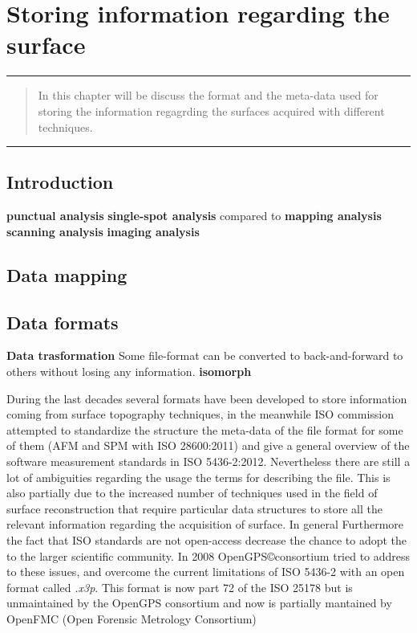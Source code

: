 \chapter{Storing information regarding the surface}

\hrule
\vspace{10pt}
\begin{quote}
{ \small In this chapter will be discuss the format and the meta-data used for storing the information regagrding the surfaces acquired with different techniques.}
\end{quote}
\hrule



\section*{Introduction}

\textbf{punctual analysis} \textbf{single-spot analysis} compared to \textbf{mapping analysis} \textbf{scanning analysis} \textbf{imaging analysis}

\section{Data mapping}
\section{Data formats}

\textbf{Data trasformation}
Some file-format can be converted to back-and-forward to others without losing any information. \textbf{isomorph}

During the last decades several formats have been developed to store information coming from surface topography techniques, in the meanwhile ISO commission attempted to standardize the structure the meta-data of the file format for some of them (AFM and SPM with ISO 28600:2011) and give a general overview of the software measurement standards in ISO 5436-2:2012. Nevertheless there are still a lot of ambiguities regarding the usage the terms for describing the file. 
This is also partially due to the increased number of techniques used in the field of surface reconstruction that require particular data structures to store all the relevant information regarding the acquisition of surface. In general 
Furthermore the fact that ISO standards are not open-access decrease the chance to adopt the to the larger scientific community. In 2008 OpenGPS\copyright\space  consortium tried to address to these issues, and overcome the current limitations of ISO 5436-2 with an open format called \textit{.x3p}.%
This format is now part 72 of the ISO 25178 but is unmaintained by the OpenGPS consortium and now is partially mantained by OpenFMC (Open Forensic Metrology Consortium)
 
